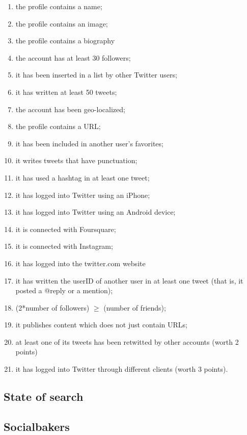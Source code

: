 \documentclass[a4paper,11pt]{article}
\begin{document}
\begin{multicols}{2}
\begin{enumerate}
\item the profile contains a name;
\item the profile contains an image;
\item the profile contains a biography
\item the account has at least 30 followers;
\item it has been inserted in a  list by other Twitter users;
\item it has written at least 50 tweets;
\item the account has been geo-localized;
\item the profile contains a URL;
\item it has been included in another user's favorites;
\item it writes tweets that have punctuation;
\item it has used a hashtag in at least one tweet;
\item it has logged into Twitter using an iPhone;
\item it has logged into Twitter using an Android device;
\item it is connected with Foursquare;
\item it is connected with Instagram;
\item it has logged into the twitter.com website
\item it has written the userID of another user in at least one tweet (that is, it posted a @reply or a mention);
\item (2*number of followers) $\geq$ (number of friends);
\item it publishes content which does not just contain URLs;
\item at least one of its tweets has been retwitted by other accounts (worth 2 points)
\item it has logged into Twitter through different clients (worth 3 points).
\end{enumerate}
\end{multicols}

\subsection{State of search}

\subsection{Socialbakers}
\end{document}

